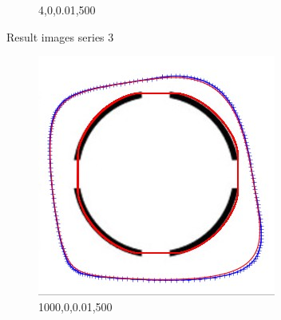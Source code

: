 \documentclass[paper=a4, fontsize=11pt]{scrartcl} %
\numberwithin{equation}{section} %
\numberwithin{figure}{section} %
\numberwithin{table}{section} %
\begin{document}
\begin{figure}[H]
\begin{subfigure}[b]{0.2\textwidth}
                \caption{4,0,0.01,500}
                \label{fig:Gestaltcircle3}
        \end{subfigure}
        \caption{Result images series 3 }\label{fig:animals}
\end{figure}


\begin{figure}[H]
        \centering
        \begin{subfigure}[b]{0.2\textwidth}
                \includegraphics[width=\textwidth]{307}
                \caption{1000,0,0.01,500}
                \label{fig:Gestaltcircle4}
        \end{subfigure}%
        ~ %
        \begin{subfigure}[b]{0.2\textwidth}

\end{subfigure}
\end{figure}
\end{document}
